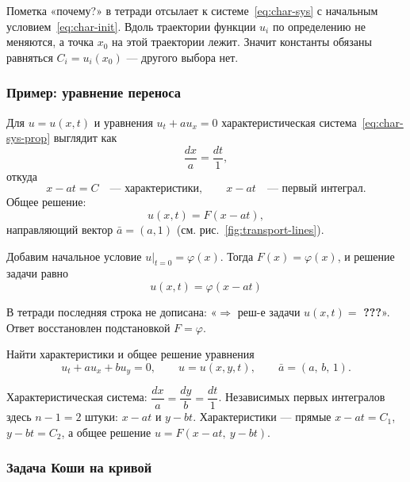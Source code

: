 \begin{idea}[title={Почему можно просто подставить $x_0$}]
Пометка «почему?» в тетради отсылает к системе~\eqref{eq:char-sys} с начальным
условием~\eqref{eq:char-init}. Вдоль траектории функции $u_i$ по определению
не меняются, а точка $x_0$ на этой траектории лежит. Значит константы обязаны
равняться $C_i = u_i(x_0)$ — другого выбора нет.
\end{idea}

\subsubsection*{Пример: уравнение переноса}

\begin{example}
Для $u = u(x,t)$ и уравнения $u_t + a u_x = 0$ характеристическая
система~\eqref{eq:char-sys-prop} выглядит как
\[
  \frac{dx}{a} = \frac{dt}{1} ,
\]
откуда
\[
  x - at = C \quad\text{— характеристики}, \qquad
  x - at \quad\text{— первый интеграл} .
\]
Общее решение:
\[
  u(x,t) = F(x - at) ,
\]
направляющий вектор $\bar a = (a,1)$ (см. рис.~\ref{fig:transport-lines}).

\medskip
Добавим начальное условие $u|_{t=0} = \varphi(x)$. Тогда $F(x) = \varphi(x)$, и
решение задачи равно
\[
  \boxed{\ u(x,t) = \varphi(x - at)\ }
\]
\end{example}

\begin{warn}
В тетради последняя строка не дописана: «$\Rightarrow$ реш-е задачи
$u(x,t) =$ \textbf{???}». Ответ восстановлен подстановкой $F = \varphi$.
\end{warn}

\begin{exercise}
Найти характеристики и общее решение уравнения
\[
  u_t + a u_x + b u_y = 0, \qquad u = u(x,y,t),
  \qquad \bar a = (a,\, b,\, 1) .
\]
\end{exercise}

\begin{idea}
Характеристическая система: $\dfrac{dx}{a} = \dfrac{dy}{b} = \dfrac{dt}{1}$.
Независимых первых интегралов здесь $n-1 = 2$ штуки: $x - at$ и $y - bt$.
Характеристики — прямые $x - at = C_1$, $y - bt = C_2$, а общее решение
$u = F(x - at,\ y - bt)$.
\end{idea}

\subsubsection*{Задача Коши на кривой}

